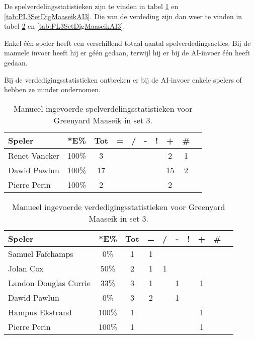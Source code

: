 De spelverdelingsstatistieken zijn te vinden in tabel \ref{tab:PL3SetMaaseikMan3} en \ref{tab:PL3SetDigMaaseikAI3}. Die van de verdeding zijn dan weer te vinden in tabel \ref{tab:PL3DigMaaseikMan3} en \ref{tab:PL3SetDigMaaseikAI3}. 

Enkel één speler heeft een verschillend totaal aantal spelverdedingsacties. Bij de manuele invoer heeft hij er géén gedaan, terwijl hij er bij de AI-invoer één heeft gedaan. 

Bij de verdedigingsstatistieken ontbreken er bij de AI-invoer enkele spelers of hebben ze minder ondernomen. 

\begin{table}[ht!]
    \centering
    \scriptsize
    \begin{tabular}{|l|c|c|c|c|c|c|c|c|c|} \hline
        \textbf{Speler} & *E\% & Tot & = & / & - & ! & + & \#\\ \hline
        Renet Vancker & 100\% & 3 &  &  &  &  & 2 & 1 \\ 
        Dawid Pawlun & 100\% & 17 &  &  &  &  & 15 & 2 \\ 
        Pierre Perin & 100\% & 2 &  &  &  &  & 2 &  \\ \hline
    \end{tabular}
    \caption[Manueel ingevoerde spelverdelingsstatistieken voor Greenyard Maaseik in set 3]{\label{tab:PL3SetMaaseikMan3}Manueel ingevoerde spelverdelingsstatistieken voor Greenyard Maaseik in set 3.}
\end{table}

\begin{table}[ht!]
    \centering
    \scriptsize
    \begin{tabular}{|l|c|c|c|c|c|c|c|c|c|} \hline
        \textbf{Speler} & *E\% & Tot & = & / & - & ! & + & \#\\ \hline
        Samuel Fafchamps & 0\% & 1 & 1 &  &  &  &  &  \\ 
        Jolan Cox & 50\% & 2 & 1 & 1 &  &  &  & \\
        Landon Douglas Currie & 33\% & 3 & 1 &  & 1 &  & 1 &  \\
        Dawid Pawlun & 0\% & 3 & 2 &  & 1 &  &  &  \\ 
        Hampus Ekstrand & 100\% & 1 &  &  &  &  & 1 &\\ 
        Pierre Perin & 100\% & 1 &  &  &  &  & 1 & \\ \hline
    \end{tabular}
    \caption[Manueel ingevoerde verdedigingsstatistieken voor Greenyard Maaseik in set 3]{\label{tab:PL3DigMaaseikMan3}Manueel ingevoerde verdedigingsstatistieken voor Greenyard Maaseik in set 3.}
\end{table}

